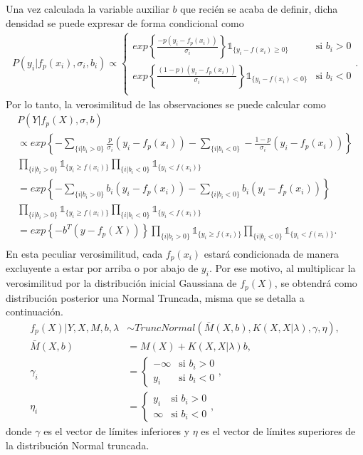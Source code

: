 Una vez calculada la variable auxiliar $b$ que reci\'en se acaba de definir, dicha densidad se puede expresar de forma condicional como
\begin{gather*}
    P(y_i | f_p(x_i),\sigma_i,b_i) \propto
    \begin{cases}
        exp \left\{
            \frac{-p(y_i-f_p(x_i))}{\sigma_i}
        \right\} \mathds{1}_{\{y_i - f(x_i) \geq 0\}} 
        &\text{si } b_i > 0\\
        exp \left\{
            \frac{(1-p)(y_i-f_p(x_i))}{\sigma_i}
        \right\} \mathds{1}_{\{y_i - f(x_i) < 0\}} 
        &\text{si } b_i < 0\\
    \end{cases}.
\end{gather*}
Por lo tanto, la verosimilitud de las observaciones se puede calcular como
\begin{gather*}
    P(Y | f_p(X),\sigma,b) \\
    \propto exp \left\{
        -\sum_{\{i|b_i > 0\}} \frac{p}{\sigma_i}(y_i-f_p(x_i)) -
        \sum_{\{i|b_i < 0\}} -\frac{1-p}{\sigma_i}(y_i-f_p(x_i))
    \right\} \\
    \prod_{\{i|b_i > 0\}}\mathds{1}_{\{y_i \geq f(x_i)\}}
    \prod_{\{i|b_i < 0\}}\mathds{1}_{\{y_i < f(x_i)\}}\\
    = exp \left\{
        -\sum_{\{i|b_i > 0\}} b_i(y_i-f_p(x_i)) -
        \sum_{\{i|b_i < 0\}} b_i(y_i-f_p(x_i))
    \right\} \\
    \prod_{\{i|b_i > 0\}}\mathds{1}_{\{y_i \geq f(x_i)\}}
    \prod_{\{i|b_i < 0\}}\mathds{1}_{\{y_i < f(x_i)\}}\\
    = exp \left\{-b^T(y-f_p(X))
    \right\}
    \prod_{\{i|b_i > 0\}}\mathds{1}_{\{y_i \geq f(x_i)\}}
    \prod_{\{i|b_i < 0\}}\mathds{1}_{\{y_i < f(x_i)\}}.\\
\end{gather*}
En esta peculiar verosimilitud, cada $f_p(x_i)$ estar\'a condicionada de manera excluyente a estar por arriba o por abajo de $y_i$. Por ese motivo, al multiplicar la verosimilitud por la distribuci\'on inicial Gaussiana de $f_p(X)$, se obtendr\'a como distribuci\'on posterior una Normal Truncada, misma que se detalla a continuaci\'on.
\begin{equation*}
\begin{aligned}
   f_p(X)|Y,X,M,b,\lambda &\sim TruncNormal(\bar{M}(X,b), K(X,X|\lambda), \gamma, \eta), \\
   \bar{M}(X,b) &= M(X) + K(X,X|\lambda)b, \\
   \gamma_i &= 
   \begin{cases}
    -\infty & \text{si }b_i > 0 \\
    y_i & \text{si }b_i < 0
   \end{cases},\\
   \eta_i &= 
   \begin{cases}
    y_i & \text{si }b_i > 0 \\
    \infty & \text{si }b_i < 0
   \end{cases},
\end{aligned}
\end{equation*}
donde $\gamma$ es el vector de l\'imites inferiores y $\eta$ es el vector de l\'imites superiores de la distribuci\'on Normal truncada.

